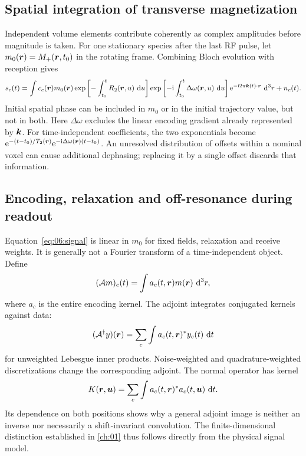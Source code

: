 \subsection{Spatial integration of transverse magnetization}
Independent volume elements contribute coherently as complex amplitudes before magnitude is taken. For one stationary species after the last RF pulse, let \(m_0(\bm{r})=M_+(\bm{r},t_0)\) in the rotating frame. Combining Bloch evolution with reception gives
\begin{equation}
 s_c(t)=\int c_c(\bm{r})m_0(\bm{r})
 \exp\left[-\int_{t_0}^t R_2(\bm{r},u)\,\mathop{}\!\mathrm{d} u\right]
 \exp\left[-\mathrm{i}\int_{t_0}^t\Delta\omega(\bm{r},u)\,\mathop{}\!\mathrm{d} u\right]
 \mathrm{e}^{-\mathrm{i}2\pi\bm{k}(t)\cdot\bm{r}}\,\mathop{}\!\mathrm{d}^3r+n_c(t).
 \label{eq:06:signal}
\end{equation}
Initial spatial phase can be included in \(m_0\) or in the initial trajectory value, but not in both. Here \(\Delta\omega\) excludes the linear encoding gradient already represented by \(\bm{k}\).
For time-independent coefficients, the two exponentials become
\(\mathrm{e}^{-(t-t_0)/T_2(\bm{r})}\mathrm{e}^{-\mathrm{i}\Delta\omega(\bm{r})(t-t_0)}\).
An unresolved distribution of offsets within a nominal voxel can cause additional dephasing; replacing it by a single offset discards that information.

\subsection{Encoding, relaxation and off-resonance during readout}
Equation~\eqref{eq:06:signal} is linear in \(m_0\) for fixed fields, relaxation and receive weights. It is generally not a Fourier transform of a time-independent object. Define
\[
 (\mathcal A m)_c(t)=\int a_c(t,\bm{r})m(\bm{r})\,\mathop{}\!\mathrm{d}^3r,
\]
where \(a_c\) is the entire encoding kernel. The adjoint integrates conjugated kernels against data:
\[
 (\mathcal A^\dagger y)(\bm{r})
 =\sum_c\int a_c(t,\bm{r})^*y_c(t)\,\mathop{}\!\mathrm{d} t
\]
for unweighted Lebesgue inner products. Noise-weighted and quadrature-weighted discretizations change the corresponding adjoint. The normal operator has kernel
\[
 K(\bm{r},\bm{u})=\sum_c\int a_c(t,\bm{r})^*a_c(t,\bm{u})\,\mathop{}\!\mathrm{d} t.
\]
Its dependence on both positions shows why a general adjoint image is neither an inverse nor necessarily a shift-invariant convolution. The finite-dimensional distinction established in \cref{ch:01} thus follows directly from the physical signal model.

